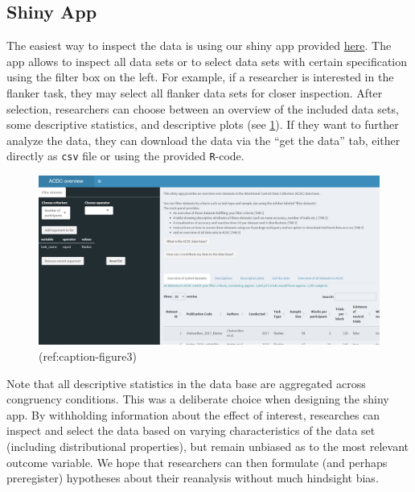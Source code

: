 \documentclass[
  man,floatsintext]{apa6}
\begin{document}
\hypertarget{shiny-app}{%
\subsection{Shiny App}\label{shiny-app}}

The easiest way to inspect the data is using our shiny app provided \href{LINKTOSHINYAPP}{here}. The app allows to inspect all data sets or to select data sets with certain specification using the filter box on the left. For example, if a researcher is interested in the flanker task, they may select all flanker data sets for closer inspection. After selection, researchers can choose between an overview of the included data sets, some descriptive statistics, and descriptive plots (see \ref{fig:figure3}). If they want to further analyze the data, they can download the data via the ``get the data'' tab, either directly as \texttt{csv} file or using the provided \texttt{R}-code.

\begin{figure}
\centering
\includegraphics{images/Shiny_interface.png}
\caption{\label{fig:figure3}(ref:caption-figure3)}
\end{figure}

Note that all descriptive statistics in the data base are aggregated across congruency conditions. This was a deliberate choice when designing the shiny app. By withholding information about the effect of interest, researches can inspect and select the data based on varying characteristics of the data set (including distributional properties), but remain unbiased as to the most relevant outcome variable. We hope that researchers can then formulate (and perhaps preregister) hypotheses about their reanalysis without much hindsight bias.
\end{document}
